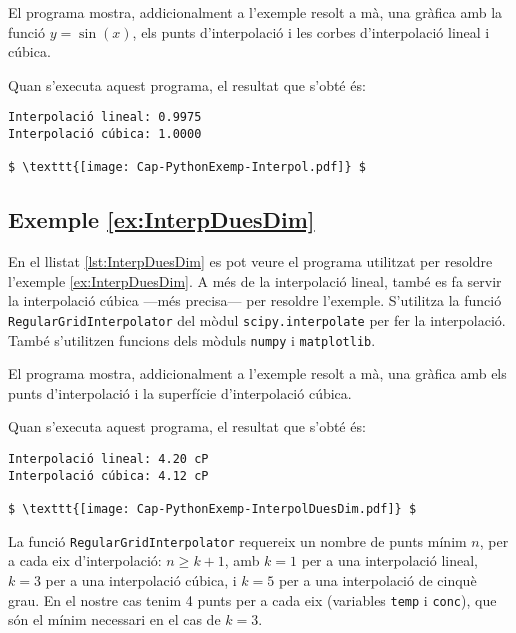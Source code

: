 

El programa mostra, addicionalment a l'exemple resolt a mà, una gràfica amb la funció $y=\sin(x)$, els punts d'interpolació i les corbes d'interpolació lineal i cúbica. 

Quan s'executa aquest programa, el resultat que s'obté és:
\lstset{
	language=,
	numbers=none,
	frame=none
}
\begin{lstlisting}[mathescape=true]
Interpolació lineal: 0.9975
Interpolació cúbica: 1.0000

$ \texttt{[image: Cap-PythonExemp-Interpol.pdf]} $
\end{lstlisting} 


\hypertarget{exemple:InterpDuesDim}{\subsection{Exemple \ref*{ex:InterpDuesDim} \InterpDuesDim}}
En el llistat \vref{lst:InterpDuesDim} es pot veure el programa utilitzat per resoldre l'exemple \vref{ex:InterpDuesDim}. A més de la interpolació lineal, també es fa servir la interpolació cúbica ---més precisa--- per resoldre l'exemple. S'utilitza la funció \texttt{RegularGridInterpolator} del mòdul \texttt{scipy.interpolate} per fer la interpolació. També s'utilitzen funcions dels mòduls \texttt{numpy} i  \texttt{matplotlib}.


El programa mostra, addicionalment a l'exemple resolt a mà, una gràfica amb els punts d'interpolació i la superfície d'interpolació cúbica.

Quan s'executa aquest programa, el resultat que s'obté és:
\lstset{
	language=,
	numbers=none,
	frame=none
}
\begin{lstlisting}[mathescape=true]
Interpolació lineal: 4.20 cP
Interpolació cúbica: 4.12 cP

$ \texttt{[image: Cap-PythonExemp-InterpolDuesDim.pdf]} $
\end{lstlisting} 


La  funció  \texttt{RegularGridInterpolator} requereix un nombre de punts  mínim $n$, per a cada eix d'interpolació: $n \geq k+1$, amb $k=1$ per a una interpolació lineal, $k=3$ per a una interpolació cúbica, i $k=5$ per a una interpolació de cinquè grau. En el nostre cas tenim 4 punts per a cada eix (variables \texttt{temp} i \texttt{conc}), que són el mínim necessari en el cas de $k=3$.

